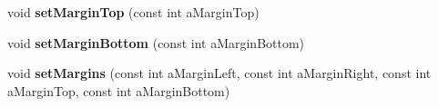 \begin{DoxyCompactItemize}
\item 
\hypertarget{class_graph_view_abstract_a45dd26edb329fb4c9c56c93bc45d9b51}{void {\bfseries set\-Margin\-Top} (const int a\-Margin\-Top)}\label{class_graph_view_abstract_a45dd26edb329fb4c9c56c93bc45d9b51}

\item 
\hypertarget{class_graph_view_abstract_ab2ed93c7ee63299e8095678f04d46c51}{void {\bfseries set\-Margin\-Bottom} (const int a\-Margin\-Bottom)}\label{class_graph_view_abstract_ab2ed93c7ee63299e8095678f04d46c51}

\item 
\hypertarget{class_graph_view_abstract_a9ede77fd2918c96b966c96b69f926c2c}{void {\bfseries set\-Margins} (const int a\-Margin\-Left, const int a\-Margin\-Right, const int a\-Margin\-Top, const int a\-Margin\-Bottom)}\label{class_graph_view_abstract_a9ede77fd2918c96b966c96b69f926c2c}

\end{DoxyCompactItemize}
